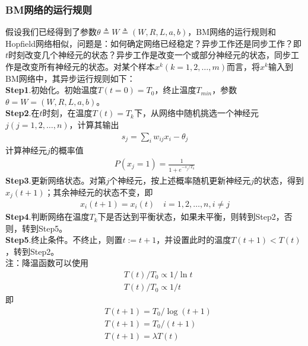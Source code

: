         \subsubsection{BM网络的运行规则}
            \par
            假设我们已经得到了参数$\theta \triangleq W \triangleq (W,R,L,a,b)$，BM网络的运行规则和Hopfield网络相似，问题是：如何确定网络已经稳定？异步工作还是同步工作？即$t$时刻改变几个神经元的状态？异步工作是改变一个或部分神经元的状态，同步工作是改变所有神经元的状态。对某个样本$x^k(k=1,2,\dots,m)$而言，将$x^k$输入到BM网络中，其异步运行规则如下：\\
            \textbf{Step1}.初始化。初始温度$T(t=0) = T_0$，终止温度$T_{min}$，参数$\theta=W=(W,R,L,a,b)$。\\
            \textbf{Step2}.在$t$时刻，在温度$T(t) = T_k$下，从网络中随机挑选一个神经元$j(j=1,2,\dots,n)$，计算其输出
            \begin{align*}
            s_j = \sum_{i} w_{ij}x_i - \theta_j
            \end{align*}
            计算神经元$j$的概率值
            \begin{align*}
            P(x_j=1) = \frac{1}{1+e^{-s_j /T_k}}
            \end{align*}
            \textbf{Step3}.更新网络状态。对第$j$个神经元，按上述概率随机更新神经元$j$的状态，得到$x_j(t+1)$；其余神经元的状态不变，即
            \begin{align*}
            x_i(t+1) = x_i(t)\quad i=1,2,\dots,n ,i\neq j
            \end{align*}
            \textbf{Step4}.判断网络在温度$T_k$下是否达到平衡状态，如果未平衡，则转到Step2，否则，转到Step5。\\
            \textbf{Step5}.终止条件。不终止，则置$t:=t+1$，并设置此时的温度$T(t+1) < T(t)$，转到Step2。\\
            注：降温函数可以使用
            \begin{align*}
            & T(t)/T_0 \propto 1/\ln t\\
            & T(t)/T_0 \propto 1/t
            \end{align*}
            即
            \begin{align*}
            & T(t+1) = T_0/\log (t+1)\\
            & T(t+1) = T_0/(t+1)\\
            & T(t+1) = \lambda T(t)
            \end{align*}

